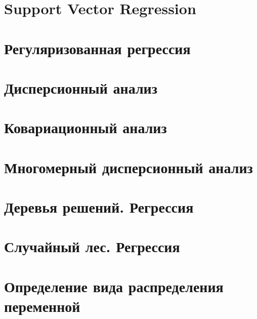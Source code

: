 \documentclass[
  letterpaper,
]{scrbook}
\theoremstyle{definition}
\theoremstyle{remark}
\begin{document}
\chapter{Support Vector Regression}\label{andan-svr}


\chapter{Регуляризованная регрессия}\label{andan-regreg}


\chapter{Дисперсионный анализ}\label{andan-anova}


\chapter{Ковариационный анализ}\label{andan-ancova}


\chapter{Многомерный дисперсионный анализ}\label{andan-manova}


\chapter{Деревья решений. Регрессия}\label{andan-treesreg}


\chapter{Случайный лес. Регрессия}\label{andan-randforestreg}


\chapter{Определение вида распределения
переменной}\label{andan-distributions}

\end{document}
